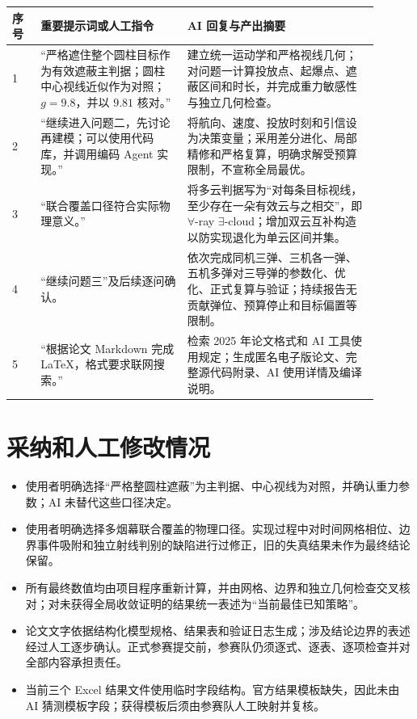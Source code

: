 \documentclass[UTF8,zihao=-4]{ctexart}
\begin{document}
\begin{longtable}{p{0.07\linewidth}p{0.36\linewidth}p{0.47\linewidth}}
\toprule
序号 & 重要提示词或人工指令 & AI 回复与产出摘要 \\
\midrule
1 & “严格遮住整个圆柱目标作为有效遮蔽主判据；圆柱中心视线近似作为对照；$g=9.8$，并以 $9.81$ 核对。” & 建立统一运动学和严格视线几何；对问题一计算投放点、起爆点、遮蔽区间和时长，并完成重力敏感性与独立几何检查。 \\
2 & “继续进入问题二，先讨论再建模；可以使用代码库，并调用编码 Agent 实现。” & 将航向、速度、投放时刻和引信设为决策变量；采用差分进化、局部精修和严格复算，明确求解受预算限制，不宣称全局最优。 \\
3 & “联合覆盖口径符合实际物理意义。” & 将多云判据写为“对每条目标视线，至少存在一朵有效云与之相交”，即 $\forall$-ray $\exists$-cloud；增加双云互补构造以防实现退化为单云区间并集。 \\
4 & “继续问题三”及后续逐问确认。 & 依次完成同机三弹、三机各一弹、五机多弹对三导弹的参数化、优化、正式复算与验证；持续报告无贡献弹位、预算停止和目标偏置等限制。 \\
5 & “根据论文 Markdown 完成 LaTeX，格式要求联网搜索。” & 检索 2025 年论文格式和 AI 工具使用规定；生成匿名电子版论文、完整源代码附录、AI 使用详情及编译说明。 \\
\bottomrule
\end{longtable}

\section{采纳和人工修改情况}

\begin{itemize}
  \item 使用者明确选择“严格整圆柱遮蔽”为主判据、中心视线为对照，并确认重力参数；AI 未替代这些口径决定。
  \item 使用者明确选择多烟幕联合覆盖的物理口径。实现过程中对时间网格相位、边界事件吸附和独立射线判别的缺陷进行过修正，旧的失真结果未作为最终结论保留。
  \item 所有最终数值均由项目程序重新计算，并由网格、边界和独立几何检查交叉核对；对未获得全局收敛证明的结果统一表述为“当前最佳已知策略”。
  \item 论文文字依据结构化模型规格、结果表和验证日志生成；涉及结论边界的表述经过人工逐步确认。正式参赛提交前，参赛队仍须逐式、逐表、逐项检查并对全部内容承担责任。
  \item 当前三个 Excel 结果文件使用临时字段结构。官方结果模板缺失，因此未由 AI 猜测模板字段；获得模板后须由参赛队人工映射并复核。
\end{itemize}
\end{document}
